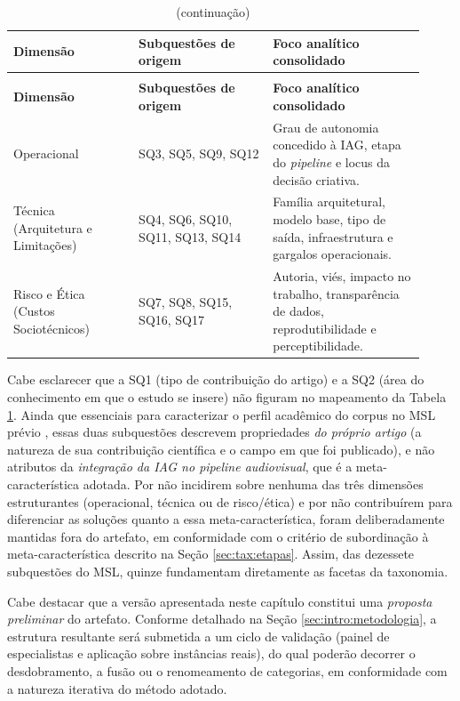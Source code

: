 \begin{longtable}{p{0.28\linewidth} p{0.30\linewidth} p{0.34\linewidth}}
\caption{Mapeamento das subquestões do MSL para as dimensões da taxonomia}
\label{tab:sq_dimensoes}\\
\hline
\textbf{Dimensão} & \textbf{Subquestões de origem} & \textbf{Foco analítico consolidado} \\
\hline
\endfirsthead
\caption[]{(continuação)}\\
\hline
\textbf{Dimensão} & \textbf{Subquestões de origem} & \textbf{Foco analítico consolidado} \\
\hline
\endhead
\hline
\endfoot
Operacional & SQ3, SQ5, SQ9, SQ12 & Grau de autonomia concedido à IAG, etapa do \textit{pipeline} e locus da decisão criativa. \\
\hline
Técnica (Arquitetura e Limitações) & SQ4, SQ6, SQ10, SQ11, SQ13, SQ14 & Família arquitetural, modelo base, tipo de saída, infraestrutura e gargalos operacionais. \\
\hline
Risco e Ética (Custos Sociotécnicos) & SQ7, SQ8, SQ15, SQ16, SQ17 & Autoria, viés, impacto no trabalho, transparência de dados, reprodutibilidade e perceptibilidade. \\
\hline
\end{longtable}

Cabe esclarecer que a SQ1 (tipo de contribuição do artigo) e a SQ2 (área do conhecimento em que o estudo se insere) não figuram no mapeamento da Tabela \ref{tab:sq_dimensoes}. Ainda que essenciais para caracterizar o perfil acadêmico do corpus no MSL prévio \citep{RothAleo2026}, essas duas subquestões descrevem propriedades \textit{do próprio artigo} (a natureza de sua contribuição científica e o campo em que foi publicado), e não atributos da \textit{integração da IAG no pipeline audiovisual}, que é a meta-característica adotada. Por não incidirem sobre nenhuma das três dimensões estruturantes (operacional, técnica ou de risco/ética) e por não contribuírem para diferenciar as soluções quanto a essa meta-característica, foram deliberadamente mantidas fora do artefato, em conformidade com o critério de subordinação à meta-característica descrito na Seção \ref{sec:tax:etapas}. Assim, das dezessete subquestões do MSL, quinze fundamentam diretamente as facetas da taxonomia.

Cabe destacar que a versão apresentada neste capítulo constitui uma \textit{proposta preliminar} do artefato. Conforme detalhado na Seção \ref{sec:intro:metodologia}, a estrutura resultante será submetida a um ciclo de validação (painel de especialistas e aplicação sobre instâncias reais), do qual poderão decorrer o desdobramento, a fusão ou o renomeamento de categorias, em conformidade com a natureza iterativa do método adotado.


